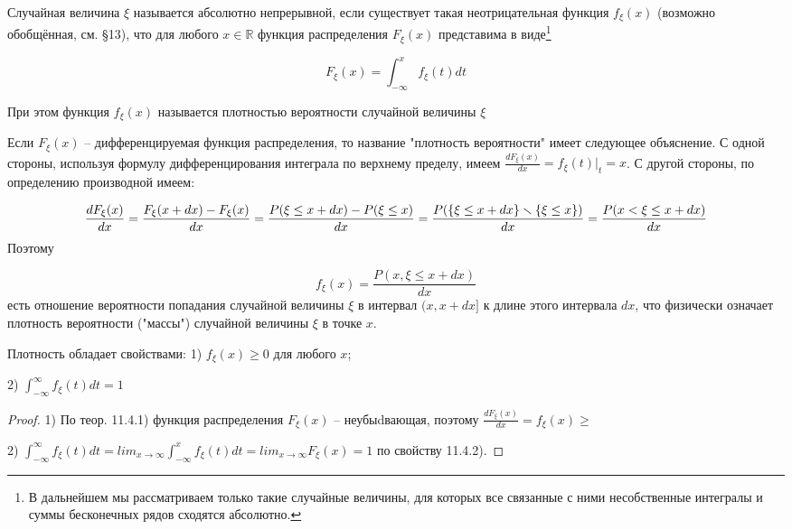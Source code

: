 \begin{definition}
	Случайная величина $\xi$ называется абсолютно непрерывной, если существует такая неотрицательная функция $f_{\xi} (x)$ (возможно обобщённая, см. §13), что для любого $x \in \mathbb{R}$ функция распределения $F_{\xi}(x)$ представима в виде\footnote{

	В дальнейшем мы рассматриваем только такие случайные величины, для которых все связанные с
ними несобственные интегралы и суммы бесконечных рядов сходятся абсолютно.
	}
  
  \begin{equation}
 F_{\xi}(x)=\int_{-\infty}^{x} f_{\xi}(t) dt  	
  \end{equation}

При этом функция $f_{\xi}(x)$ называется плотностью вероятности случайной величины $\xi$
\end{definition}

\begin{zam}
Если $F_{\xi}(x)$ -- дифференцируемая функция распределения, то название "плотность вероятности" имеет следующее объяснение. С одной стороны, используя формулу дифференцирования интеграла по верхнему пределу, имеем $\frac{dF_{\xi}(x)}{dx}=f_{\xi}(t)|_t=x$. С другой стороны, по определению производной имеем:

\begin{equation}
	\frac{dF_{\xi}(x)}{dx} = \frac{F_{\xi}(x+dx)-F_{\xi}(x)}{dx}=\frac{P(\xi \leq x+dx)-P(\xi \leq x)}{dx}=\frac{P(\{\xi \leq x+dx \}\smallsetminus \{\xi \leq x\})}{dx} = \frac{P(x<\xi \leq x+dx)}{dx}
\end{equation}
Поэтому

\begin{equation}
	f_{\xi}(x)=\frac{P(x,\xi \leq x+dx)}{dx}	
\end{equation}
есть отношение вероятности попадания случайной величины $\xi$ в интервал $(x, x+dx]$ к длине этого интервала $dx$, что физически означает плотность вероятности ("массы") случайной величины $\xi$ в точке $x$.
\end{zam}
 

 \begin{theorem}
Плотность обладает свойствами:
1) $f_{\xi}(x) \geq 0$ для любого $x$;

2) $\int_{-\infty}^{\infty} f_{\xi}(t)dt=1$
 \end{theorem}

\begin{proof}
1) По теор. 11.4.1) функция распределения $F_{\xi}(x)$ -- неубыdвающая, поэтому $\frac{dF_{\xi}(x)}{dx}=f_{\xi}(x) \geq$

2) $\int_{-\infty}^{\infty}f_{\xi}(t)dt = lim_{x \to \infty}\int_{-\infty}^{x}f_{\xi}(t)dt = lim_{x \to \infty}F_{\xi}(x) = 1$ по свойству 11.4.2).
\end{proof} 

